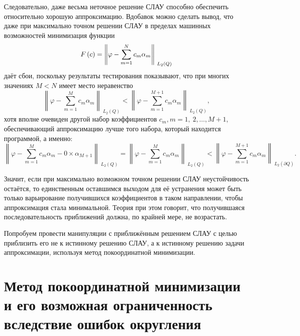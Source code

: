 ﻿\documentclass[a4paper, 12pt]{article}
\begin{document}
Следовательно, даже весьма неточное решение СЛАУ способно обеспечить относительно хорошую аппроксимацию. Вдобавок можно сделать вывод, что даже при максимально точном решении СЛАУ в пределах машинных возможностей минимизация функции
\begin{equation}F\left(c\right)={\left\|\varphi -\sum^N_{m=1}{c_m}{\alpha }_m\right\|}_{{\ L}_2\left(Q\right)}\\\end{equation} 
даёт сбои, поскольку результаты тестирования показывают, что при многих значениях $M<N$ имеет место неравенство
\begin{equation}{\left\|\varphi -\sum^M_{m=1}{c_m}{\alpha }_m\right\|}_{{\ L}_2\left(Q\right)}<{\left\|\varphi -\sum^{M+1}_{m=1}{c_m}{\alpha }_m\right\|}_{{\ L}_2\left(Q\right)},\end{equation} 
хотя вполне очевиден другой набор коэффициентов $c_m,m=1,\ 2,\dots ,M+1$, обеспечивающий аппроксимацию лучше того набора, который находится программой, а именно:
\begin{equation}{\left\|\varphi -\sum^M_{m=1}{c_m}{\alpha }_m-{0\times \alpha }_{M+1}\right\|}_{{\ L}_2\left(Q\right)}={\left\|\varphi -\sum^M_{m=1}{c_m}{\alpha }_m\right\|}_{{\ L}_2\left(Q\right)}<{\left\|\varphi -\sum^{M+1}_{m=1}{c_m}{\alpha }_m\right\|}_{{\ L}_2\left(\partial Q\right)}.\end{equation} 

Значит, если при максимально возможном точном решении СЛАУ неустойчивость остаётся, то единственным оставшимся выходом для её устранения может быть только варьирование получившихся коэффициентов в таком направлении, чтобы аппроксимация стала минимальной. Теория при этом говорит, что получившаяся последовательность приближений должна, по крайней мере, не возрастать.

Попробуем провести манипуляции с приближённым решением СЛАУ с целью приблизить его не к истинному решению СЛАУ, а к истинному решению задачи аппроксимации, используя метод покоординатной минимизации.

\section{Метод покоординатной минимизации и его возможная ограниченность вследствие ошибок округления}
\end{document}
